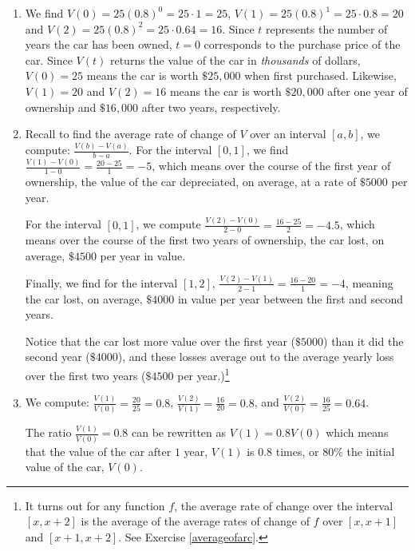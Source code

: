 \documentclass{ximera}
\begin{document}
\begin{example}
\begin{explanation}
\begin{enumerate}
\item We find $V(0) = 25(0.8)^{0} = 25 \cdot 1 = 25$, $V(1) = 25(0.8)^1 = 25 \cdot 0.8 = 20$ and $V(2) = 25(0.8)^2 = 25 \cdot 0.64 = 16$.  Since $t$ represents the number of years the car has been owned, $t=0$ corresponds to the purchase price of the car. Since $V(t)$ returns the value of the car in \textit{thousands} of dollars, $V(0) = 25$ means the car is worth $\$ 25, \! 000$ when first purchased.  Likewise, $V(1) = 20$  and $V(2) =16$ means the car is worth $\$20, \! 000$ after one year of ownership and  $\$16, \! 000$ after two years, respectively.

\item  Recall to find the average rate of change of $V$ over an interval $[a,b]$, we compute: $\frac{V(b) - V(a)}{b-a}$.  For the interval $[0,1]$, we find $\frac{V(1) - V(0)}{1-0} = \frac{20-25}{1} = -5$, which means over the course of the first year of ownership, the value of the car depreciated, on average, at a rate of $\$ 5000$ per year.  

 

For the interval $[0,1]$, we compute $\frac{V(2) - V(0)}{2-0} = \frac{16-25}{2} = -4.5$, which means over the course of the first two years of ownership, the car lost, on average,  $ \$4500$ per year in value. 
 

Finally, we find for the interval $[1,2]$,  $\frac{V(2) - V(1)}{2-1} = \frac{16-20}{1} = -4$, meaning the car lost, on average, $\$4000$ in value per year between the first and second years. 

 

Notice that the car lost more value over the first year ($\$5000$) than it did the second year ($\$4000$), and these losses average out to the average yearly loss over the first two years ($\$4500$ per year.)\footnote{It turns out for any function $f$, the average rate of change over the interval $[x, x+2]$ is the average of the average rates of change of $f$ over $[x, x+1]$ and $[x+1, x+2]$.  See Exercise \ref{averageofarc}.}


\item  We compute: $\frac{V(1)}{V(0)} = \frac{20}{25} = 0.8$, $\frac{V(2)}{V(1)} = \frac{16}{20} = 0.8$, and $\frac{V(2)}{V(0)} = \frac{16}{25} =0.64$.  


 

The ratio $\frac{V(1)}{V(0)} = 0.8$ can be rewritten as $V(1) = 0.8 V(0)$ which means that the value of the car after $1$ year, $V(1)$  is $0.8$ times, or $80 \%$ the initial value of the car, $V(0)$.  



\end{enumerate}
\end{explanation}
\end{example}
\end{document}

